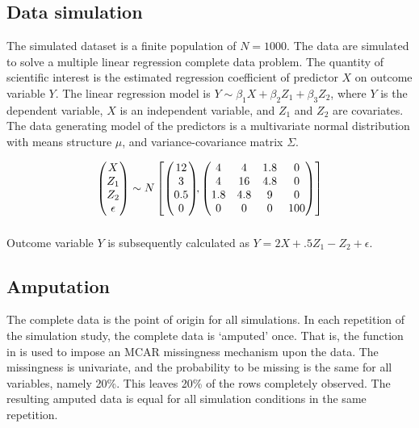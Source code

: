 \documentclass[article]{jss}
\newcommand{\fct}[1]{\code{#1()}}
\begin{document}
\subsection{Data simulation}
The simulated dataset is a finite population of $N=1000$. The data are simulated to solve a multiple linear regression complete data problem. The quantity of scientific interest is the estimated regression coefficient of predictor $X$ on outcome variable $Y$. The linear regression model is $Y \sim \beta_1 X + \beta_2 Z_1 + \beta_3 Z_2$, where $Y$ is the dependent variable, $X$ is an independent variable, and $Z_1$ and $Z_2$ are covariates. The data generating model of the predictors is a multivariate normal distribution with means structure $\mu$, and variance-covariance matrix $\Sigma$. 

\begin{align*}
\begin{pmatrix}X\\
Z_{1}\\
Z_{2}\\
\epsilon
\end{pmatrix} \sim  N
\begin{bmatrix}
\begin{pmatrix}
12\\
3\\
0.5\\
0
\end{pmatrix}\!\!,
\begin{pmatrix}
4 & 4 & 1.8 & 0\\
4 & 16 & 4.8 & 0\\
1.8 & 4.8 & 9 & 0\\
0 & 0 & 0 & 100
\end{pmatrix}
\end{bmatrix}\\[2\jot]
\end{align*}

Outcome variable $Y$ is subsequently calculated as $Y =  2X + .5Z_1 - Z_2 + \epsilon$.

\subsection{Amputation}
The complete data is the point of origin for all simulations. In each repetition of the simulation study, the complete data is `amputed' once. That is, the  function \fct{ampute} in  is used to impose an MCAR missingness mechanism upon the data. The missingness is univariate, and the probability to be missing is the same for all variables, namely 20\%. This leaves 20\% of the rows completely observed. The resulting amputed data is equal for all simulation conditions in the same repetition.%
\end{document}
